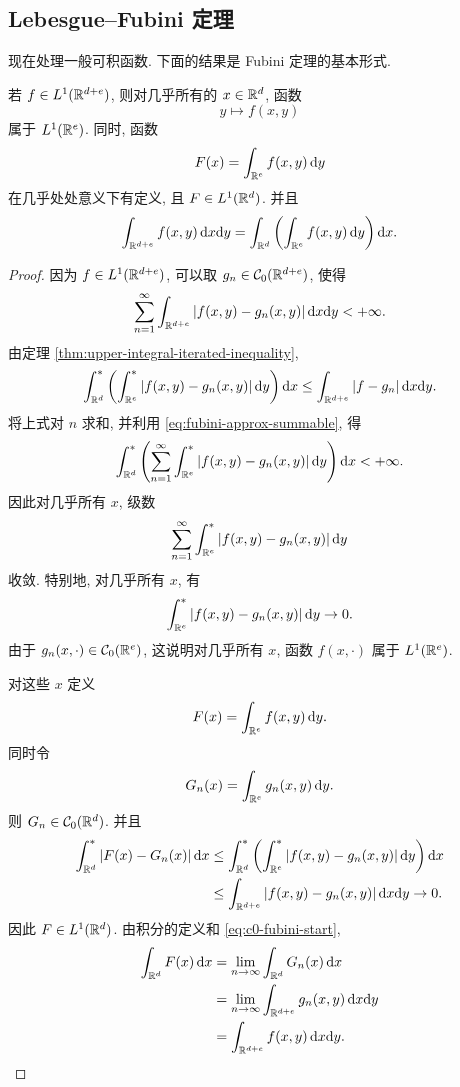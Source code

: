 \subsection{Lebesgue--Fubini 定理}

现在处理一般可积函数. 下面的结果是 Fubini 定理的基本形式.

\begin{thm}
	\label{thm:lebesgue-fubini}
	若 \(f\in L^1(\mathbb{R}^{d+e})\), 则对几乎所有的 \(x\in\mathbb{R}^d\), 函数
	\[
	y\longmapsto f(x,y)
	\]
	属于 \(L^1(\mathbb{R}^e)\). 同时, 函数
	\[
	F(x)=\int_{\mathbb{R}^e}f(x,y)\,\dd y
	\]
	在几乎处处意义下有定义, 且 \(F\in L^1(\mathbb{R}^d)\). 并且
	\begin{equation}
		\int_{\mathbb{R}^{d+e}}f(x,y)\,\dd x\dd y
		=
		\int_{\mathbb{R}^d}\left(\int_{\mathbb{R}^e}f(x,y)\,\dd y\right)\dd x.
		\label{eq:lebesgue-fubini}
	\end{equation}
\end{thm}

\begin{proof}
	因为 \(f\in L^1(\mathbb{R}^{d+e})\), 可以取 \(g_n\in\mathcal{C}_0(\mathbb{R}^{d+e})\), 使得
	\begin{equation}
		\sum_{n=1}^{\infty}
		\int_{\mathbb{R}^{d+e}}|f(x,y)-g_n(x,y)|\,\dd x\dd y<+\infty.
		\label{eq:fubini-approx-summable}
	\end{equation}
	由定理 \ref{thm:upper-integral-iterated-inequality},
	\[
	\int_{\mathbb{R}^d}^{*}\left(
	\int_{\mathbb{R}^e}^{*}|f(x,y)-g_n(x,y)|\,\dd y
	\right)\dd x
	\leq
	\int_{\mathbb{R}^{d+e}}|f-g_n|\,\dd x\dd y.
	\]
	将上式对 \(n\) 求和, 并利用 \eqref{eq:fubini-approx-summable}, 得
	\[
	\int_{\mathbb{R}^d}^{*}\left(
	\sum_{n=1}^{\infty}
	\int_{\mathbb{R}^e}^{*}|f(x,y)-g_n(x,y)|\,\dd y
	\right)\dd x<+\infty.
	\]
	因此对几乎所有 \(x\), 级数
	\[
	\sum_{n=1}^{\infty}
	\int_{\mathbb{R}^e}^{*}|f(x,y)-g_n(x,y)|\,\dd y
	\]
	收敛. 特别地, 对几乎所有 \(x\), 有
	\[
	\int_{\mathbb{R}^e}^{*}|f(x,y)-g_n(x,y)|\,\dd y\to0.
	\]
	由于 \(g_n(x,\cdot)\in\mathcal{C}_0(\mathbb{R}^e)\), 这说明对几乎所有 \(x\), 函数 \(f(x,\cdot)\) 属于 \(L^1(\mathbb{R}^e)\).
	
	对这些 \(x\) 定义
	\[
	F(x)=\int_{\mathbb{R}^e}f(x,y)\,\dd y.
	\]
	同时令
	\[
	G_n(x)=\int_{\mathbb{R}^e}g_n(x,y)\,\dd y.
	\]
	则 \(G_n\in\mathcal{C}_0(\mathbb{R}^d)\). 并且
	\begin{align*}
		\int_{\mathbb{R}^d}^{*}|F(x)-G_n(x)|\,\dd x
		&\leq
		\int_{\mathbb{R}^d}^{*}\left(
		\int_{\mathbb{R}^e}^{*}|f(x,y)-g_n(x,y)|\,\dd y
		\right)\dd x\\
		&\leq
		\int_{\mathbb{R}^{d+e}}|f(x,y)-g_n(x,y)|\,\dd x\dd y\to0.
	\end{align*}
	因此 \(F\in L^1(\mathbb{R}^d)\). 由积分的定义和 \eqref{eq:c0-fubini-start},
	\begin{align*}
		\int_{\mathbb{R}^d}F(x)\,\dd x
		&=\lim_{n\to\infty}\int_{\mathbb{R}^d}G_n(x)\,\dd x\\
		&=\lim_{n\to\infty}\int_{\mathbb{R}^{d+e}}g_n(x,y)\,\dd x\dd y\\
		&=\int_{\mathbb{R}^{d+e}}f(x,y)\,\dd x\dd y.
	\end{align*}
\end{proof}

